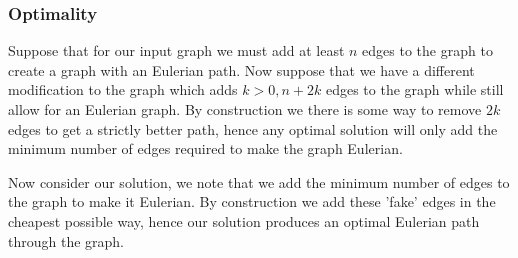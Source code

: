\documentclass[a4paper]{article}
\begin{document}
\subsubsection*{Optimality}
	
Suppose that for our input graph we must add at least $n$ edges to the graph to 
create a graph with an Eulerian path. Now suppose that we have a different modification to 
the graph which adds $k > 0, n+2k$ edges to the graph while still allow for an Eulerian graph.
By construction we there is some way to remove $2k$ edges to get a strictly better path, hence 
any optimal solution will only add the minimum number of edges required to make the graph Eulerian.

Now consider our solution, we note that we add the minimum number of edges to the graph to make it 
Eulerian. By construction we add these 'fake' edges in the cheapest possible way, hence 
our solution produces an optimal Eulerian path through the graph.
\end{document}
